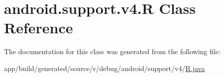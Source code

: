 \hypertarget{classandroid_1_1support_1_1v4_1_1_r}{}\section{android.\+support.\+v4.\+R Class Reference}
\label{classandroid_1_1support_1_1v4_1_1_r}


The documentation for this class was generated from the following file\+:\begin{DoxyCompactItemize}
\item 
app/build/generated/source/r/debug/android/support/v4/\hyperlink{app_2build_2generated_2source_2r_2debug_2android_2support_2v4_2_r_8java}{R.\+java}\end{DoxyCompactItemize}
